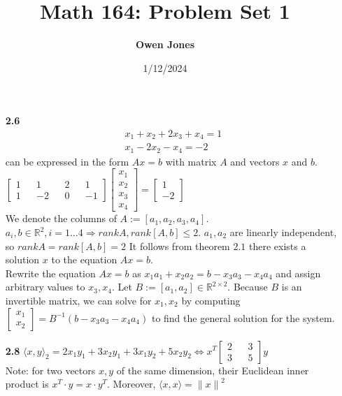 \documentclass[10pt]{article}
\title{\bf Math 164: Problem Set 1}
\date{1/12/2024}
\author{\bf Owen Jones}
\begin{document}
\maketitle
\begin{enumerate}
    \item [\bf{2.6}] \begin{align*}
        x_1+x_2+2x_3+x_4=1\\
        x_1-2x_2-x_4=-2
    \end{align*} can be expressed in the form $Ax=b$ with matrix $A$ and vectors $x$ and $b$.\\
    $\begin{bmatrix}
       1 && 1 && 2 && 1\\
       1 && -2 && 0 && -1
    \end{bmatrix}\begin{bmatrix}
        x_1\\
        x_2\\
        x_3\\
        x_4
    \end{bmatrix}=\begin{bmatrix}
        1\\
        -2
    \end{bmatrix}$\\
    We denote the columns of $A:=[a_1,a_2,a_3,a_4]$. 
    $a_i,b\in\mathbb{R}^2,i=1\ldots4\Rightarrow rankA,rank[A,b]\le 2$. $a_1,a_2$ are linearly independent, so $rankA=rank[A,b]=2$
    It follows from theorem $2.1$ there exists a solution $x$ to the equation $Ax=b$.\\
    Rewrite the equation $Ax=b$ as $x_1a_1+x_2a_2=b-x_3a_3-x_4a_4$ and assign arbitrary values to $x_3,x_4$. Let $B:=[a_1,a_2]\in \mathbb{R}^{2\times2}$. 
    Because $B$ is an invertible matrix, we can solve for $x_1,x_2$ by computing 
    $\begin{bmatrix}
        x_1\\
        x_2
    \end{bmatrix}=B^{-1}(b-x_3a_3-x_4a_4)$ to find the general solution for the system. 
    \item [\bf{2.8}] $\langle x,y\rangle_2=2x_1y_1+3x_2y_1+3x_1y_2+5x_2y_2\Leftrightarrow x^T\begin{bmatrix}
        2 && 3\\
        3 && 5
    \end{bmatrix}y$\\ 
    Note: for two vectors $x,y$ of the same dimension, their Euclidean inner product is $x^T\cdot y=x\cdot y^T$. Moreover, $\langle x,x\rangle={\lVert x\rVert}^2$

\end{enumerate}
\end{document}
